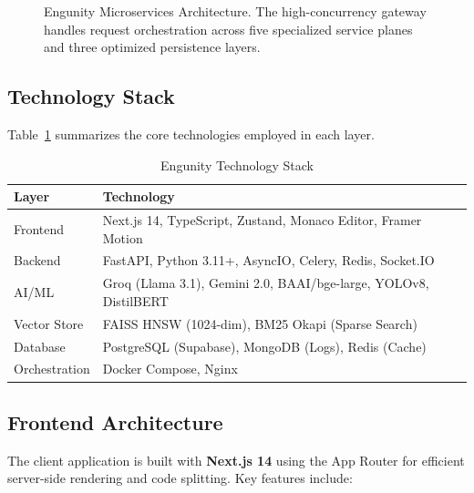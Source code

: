 \documentclass[conference]{IEEEtran}
\begin{document}
\begin{figure}[htbp]
{%
}
\caption{Engunity Microservices Architecture. The high-concurrency gateway handles request orchestration across five specialized service planes and three optimized persistence layers.}
\label{fig:arch}
\end{figure}

\subsection{Technology Stack}

Table~\ref{tab:techstack} summarizes the core technologies employed in each layer.

\begin{table}[htbp]
\caption{Engunity Technology Stack}
\begin{center}
\begin{tabularx}{\linewidth}{|l|X|}
\hline
\textbf{Layer} & \textbf{Technology} \\
\hline
Frontend & Next.js 14, TypeScript, Zustand, Monaco Editor, Framer Motion \\
\hline
Backend & FastAPI, Python 3.11+, AsyncIO, Celery, Redis, Socket.IO \\
\hline
AI/ML & Groq (Llama 3.1), Gemini 2.0, BAAI/bge-large, YOLOv8, DistilBERT \\
\hline
Vector Store & FAISS HNSW (1024-dim), BM25 Okapi (Sparse Search) \\
\hline
Database & PostgreSQL (Supabase), MongoDB (Logs), Redis (Cache) \\
\hline
Orchestration & Docker Compose, Nginx \\
\hline
\end{tabularx}
\label{tab:techstack}
\end{center}
\end{table}

\subsection{Frontend Architecture}

The client application is built with \textbf{Next.js 14} using the App Router for efficient server-side rendering and code splitting. Key features include:
\end{document}
